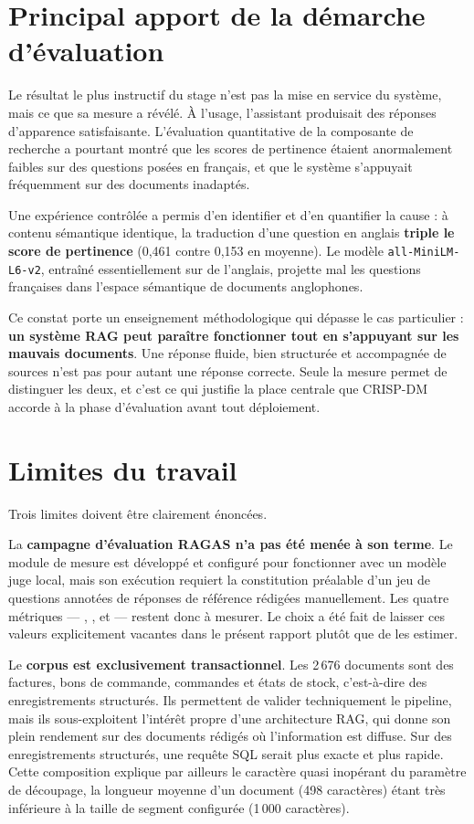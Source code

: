 \section*{Principal apport de la démarche d'évaluation}

Le résultat le plus instructif du stage n'est pas la mise en service du système,
mais ce que sa mesure a révélé. À l'usage, l'assistant produisait des réponses
d'apparence satisfaisante. L'évaluation quantitative de la composante de
recherche a pourtant montré que les scores de pertinence étaient anormalement
faibles sur des questions posées en français, et que le système s'appuyait
fréquemment sur des documents inadaptés.

Une expérience contrôlée a permis d'en identifier et d'en quantifier la cause :
à contenu sémantique identique, la traduction d'une question en anglais
\textbf{triple le score de pertinence} (0,461 contre 0,153 en moyenne). Le modèle
\texttt{all-MiniLM-L6-v2}, entraîné essentiellement sur de l'anglais, projette
mal les questions françaises dans l'espace sémantique de documents anglophones.

Ce constat porte un enseignement méthodologique qui dépasse le cas particulier :
\textbf{un système RAG peut paraître fonctionner tout en s'appuyant sur les
mauvais documents}. Une réponse fluide, bien structurée et accompagnée de sources
n'est pas pour autant une réponse correcte. Seule la mesure permet de distinguer
les deux, et c'est ce qui justifie la place centrale que CRISP-DM accorde à la
phase d'évaluation avant tout déploiement.

\section*{Limites du travail}

Trois limites doivent être clairement énoncées.

La \textbf{campagne d'évaluation RAGAS n'a pas été menée à son terme}. Le module
de mesure est développé et configuré pour fonctionner avec un modèle juge local,
mais son exécution requiert la constitution préalable d'un jeu de questions
annotées de réponses de référence rédigées manuellement. Les quatre métriques ---
, ,  et
 --- restent donc à mesurer. Le choix a été fait de laisser
ces valeurs explicitement vacantes dans le présent rapport plutôt que de les
estimer.

Le \textbf{corpus est exclusivement transactionnel}. Les 2\,676 documents sont
des factures, bons de commande, commandes et états de stock, c'est-à-dire des
enregistrements structurés. Ils permettent de valider techniquement le pipeline,
mais ils sous-exploitent l'intérêt propre d'une architecture RAG, qui donne son
plein rendement sur des documents rédigés où l'information est diffuse. Sur des
enregistrements structurés, une requête SQL serait plus exacte et plus rapide.
Cette composition explique par ailleurs le caractère quasi inopérant du paramètre
de découpage, la longueur moyenne d'un document (498 caractères) étant très
inférieure à la taille de segment configurée (1\,000 caractères).


